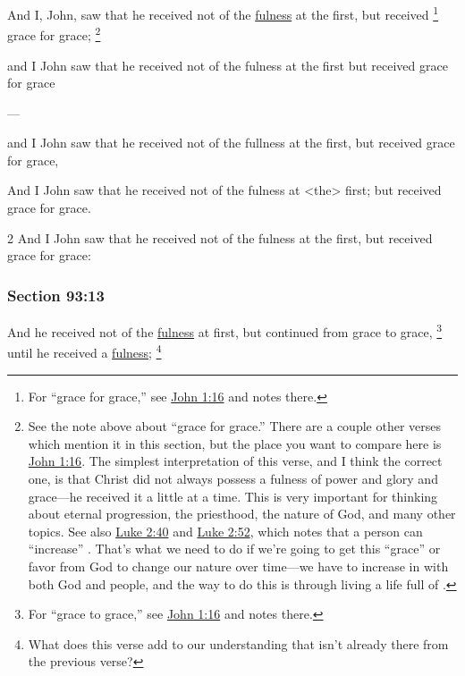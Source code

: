		And I, John, saw that he received not of the \hyperref[FULNESS]{fulness} at the first, but received
			\footnote{%
				For ``grace for grace,'' see \hyperref[JOHN-1-16]{John 1:16} and notes there.
				}%
		grace for grace;%
			\footnote{%
				See the note above about ``grace for grace.'' There are a couple other verses which mention it in this section, but the place you want to compare here is \hyperref[JOHN-1-16]{John 1:16}. The simplest interpretation of this verse, and I think the correct one, is that Christ did not always possess a fulness of power and glory and grace---he received it a little at a time. This is very important for thinking about eternal progression, the priesthood, the nature of God, and many other topics. See also \hyperref[LUKE-2-40]{Luke 2:40} and \hyperref[LUKE-2-52]{Luke 2:52}, which notes that a person can ``increase'' . That's what we need to do if we're going to get this ``grace'' or favor from God to change our nature over time---we have to increase in  with both God and people, and the way to do this is through living a life full of .
				} 

		\begin{framed}
		\scriptsize
			\begin{compactdesc}
				\item[JSP] and I John saw that he received not of the fulness at the first but received grace for grace
				\item[BC] ---
				\item[RB2] and I John saw that he received not of the fullness at the first, but received grace for grace, 
				\item[RB1] And I John saw that he received not of the fulness at <the> first; but received grace for grace. 
				\item[DC 1835] 2 And I John saw that he received not of the fulness at the first, but received grace for grace: 
			\end{compactdesc}
		\end{framed}

	\subsubsection{Section 93:13} %
		\label{DC93-13}

		And he received not of the \hyperref[FULNESS]{fulness} at first, but continued from grace to grace,%
			\footnote{%
				For ``grace to grace,'' see \hyperref[JOHN-1-16]{John 1:16} and notes there.
				}
		until he received a \hyperref[FULNESS]{fulness};%
			\footnote{%
				What does this verse add to our understanding that isn't already there from the previous verse? 
				}

